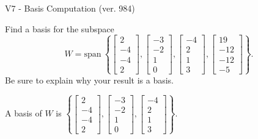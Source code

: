 \begin{exercise}
  \begin{exerciseTitle}V7 - Basis Computation (ver. 984)\end{exerciseTitle}
  \begin{exerciseStatement}
    Find a basis for the subspace 
\[W=\mathrm{span}\ \left\{\left[\begin{array}{r}
2 \\
-4 \\
-4 \\
2
\end{array}\right] , \left[\begin{array}{r}
-3 \\
-2 \\
1 \\
0
\end{array}\right] , \left[\begin{array}{r}
-4 \\
2 \\
1 \\
3
\end{array}\right] , \left[\begin{array}{r}
19 \\
-12 \\
-12 \\
-5
\end{array}\right]\right\}.\]
 Be sure to explain why your result is a basis.


  \end{exerciseStatement}
  \begin{exerciseAnswer}
   A basis of \(W\) is  \(\left\{\left[\begin{array}{r}
2 \\
-4 \\
-4 \\
2
\end{array}\right] , \left[\begin{array}{r}
-3 \\
-2 \\
1 \\
0
\end{array}\right] , \left[\begin{array}{r}
-4 \\
2 \\
1 \\
3
\end{array}\right]\right\}\).
  


  \end{exerciseAnswer}
\end{exercise}